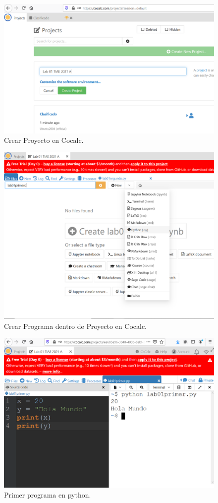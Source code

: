 \documentclass[12pt,oneside,spanish]{article}
\begin{document}
\begin{figure}
    \centering
    \includegraphics[width=12cm]{crearProyecto.png}
    \caption{Crear Proyecto en Cocalc.}
    \label{fig:crearProyecto}
\end{figure}

\begin{figure}
    \centering
    \includegraphics[width=12cm]{crearPrograma.png}
    \caption{Crear Programa dentro de Proyecto en Cocalc.}
    \label{fig:crearPrograma}
\end{figure}

\begin{figure}
    \centering
    \includegraphics[width=12cm]{primer.png}
    \caption{Primer programa en python.}
    \label{fig:primer}
\end{figure}
\end{document}
